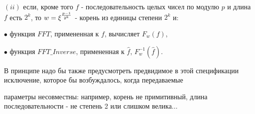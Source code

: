 \documentclass{mai_book}
\begin{document}
	$(ii)$ если, кроме того  $f$ - последовательность целых чисел по модулю $p$ и длина $f$ есть $2^{k}$, то $w = \xi^{p-1\over{2^k}}$	- корень из единицы степени $2^k$ и:
	
	$\bullet$ функция $FFT$, примененная к $f$, вычисляет $F_{w}(f)$,
	
	$\bullet$ функция $FFT \_ Inverse$, примененная к $\hat f$, $F_{w}^{-1}(\hat f)$.
	
	В принципе надо бы также предусмотреть предвидимое в этой спецификации исключение, которое бы возбуждалось, когда передаваемые\\
	
	\newpage
	
	
	
		
	\noindent параметры несовместны: например, корень не примитивный, длина последовательности - не степень 2 или слишком велика...
	
	\bigskip
	
	
	\medskip
	
\end{document}

